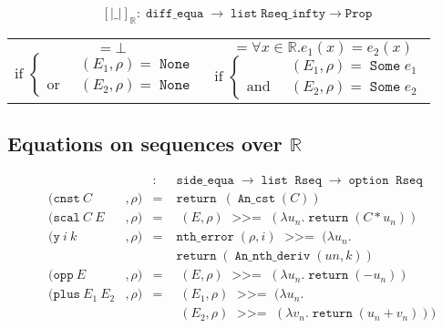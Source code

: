 \documentclass{article}
\newcommand{\Prop}{\texttt{Prop}}
\newcommand{\N}{\mathbb{N}}
\newcommand{\R}{\mathbb{R}}
\DeclareMathOperator{\None}{\mathtt{None}}
\DeclareMathOperator{\Some}{\mathtt{Some}}
\DeclareMathOperator{\return}{\mathtt{return}}
\DeclareMathOperator{\bind}{~\mathtt{>>=}~}
\DeclareMathOperator{\Rseq}{\mathtt{Rseq}}
\DeclareMathOperator{\ntherr}{\mathtt{nth\_error}}
\DeclareMathOperator{\option}{\mathtt{option}}
\DeclareMathOperator{\alist}{\mathtt{list}}
\DeclareMathOperator{\de}{\mathtt{diff\_equa}}
\DeclareMathOperator{\se}{\mathtt{side\_equa}}
\DeclareMathOperator{\Interp}{\mathtt{interp}}
\DeclareMathOperator{\Sem}{\left[\left| E_1 :=: E_2 \right|\right]}
\DeclareMathOperator{\SemR}{\Sem_{\R} \rho}
\DeclareMathOperator{\IR}{\Interp_{\R}}
\DeclareMathOperator{\IN}{\Interp_{\N}}
\DeclareMathOperator{\C}{\mathtt{An\_cst}}
\DeclareMathOperator{\Dn}{\mathtt{An\_nth\_deriv}}
\begin{document}
$$\left[\left| \_ \right|\right]_{\R} : \de \rightarrow \alist{}
\mathtt{Rseq\_infty} \rightarrow \Prop$$
\begin{tabular}{l|l}

\begin{minipage}{0.42\textwidth}
$$\SemR{} = \bot$$
$$ \text{if } \left\lbrace
\begin{array}{ll}
& \IR(E_1, \rho) = \None\\
\text{or} & \IR(E_2, \rho) = \None
\end{array}\right.$$
\end{minipage}

& \begin{minipage}{0.58\textwidth}
$$\SemR{} = \forall x \in \R. e_1(x) = e_2(x)$$
$$\text{if } \left\lbrace
\begin{array}{ll}
& \IR(E_1, \rho) = \Some e_1\\
\text{and} & \IR(E_2, \rho) = \Some e_2
\end{array}\right.$$
\end{minipage}

\end{tabular}

\subsection{Equations on sequences over $\R$}

\label{interpN}
$$\begin{array}{lllcl}
\IN & & & : & \se \rightarrow \alist{} \Rseq \rightarrow \option{} \Rseq \\
\IN & (\mathtt{cnst}~ C & , \rho) & = & \return~ (\C{}(C))\\
\IN & (\mathtt{scal}~ C ~ E &, \rho) & = & \IN(E, \rho) \bind (\lambda u_n. \return (C * u_n))\\
\IN & (\mathtt{y} ~ i ~ k &, \rho) & = & \ntherr(\rho, i) \bind (\lambda u_n. \\
    & & &   & \return (\Dn{}(un,k)) \\
\IN & (\mathtt{opp} ~E &, \rho) & = & \IN(E,\rho) \bind (\lambda u_n. \return (- u_n))\\
\IN & (\mathtt{plus} ~ E_1 ~ E_2 &, \rho) & = & \IN(E_1,\rho) \bind (\lambda u_n.\\
    & & &   & \IN(E_2,\rho) \bind (\lambda v_n. \return (u_n + v_n)))\\
\end{array}$$
\end{document}
